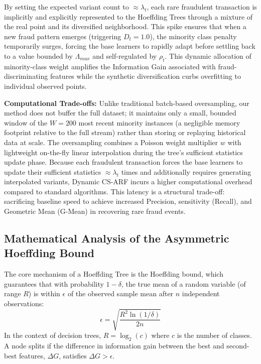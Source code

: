 \documentclass[review,12pt]{elsarticle}
\begin{document}
By setting the expected variant count to $\approx \lambda_t$, each rare fraudulent transaction is implicitly and explicitly represented to the Hoeffding Trees through a mixture of the real point and its diversified neighborhood. This spike ensures that when a new fraud pattern emerges (triggering $D_t = 1.0$), the minority class penalty temporarily surges, forcing the base learners to rapidly adapt before settling back to a value bounded by $\Lambda_{max}$ and self-regulated by $\rho_t$. This dynamic allocation of minority-class weight amplifies the Information Gain associated with fraud-discriminating features while the synthetic diversification curbs overfitting to individual observed points.

\textbf{Computational Trade-offs:} Unlike traditional batch-based oversampling, our method does not buffer the full dataset; it maintains only a small, bounded window of the $W{=}200$ most recent minority instances (a negligible memory footprint relative to the full stream) rather than storing or replaying historical data at scale. The oversampling combines a Poisson weight multiplier $w$ with lightweight on-the-fly linear interpolation during the tree's sufficient statistics update phase. Because each fraudulent transaction forces the base learners to update their sufficient statistics $\approx \lambda_t$ times and additionally requires generating interpolated variants, Dynamic CS-ARF incurs a higher computational overhead compared to standard algorithms. This latency is a structural trade-off: sacrificing baseline speed to achieve increased Precision, sensitivity (Recall), and Geometric Mean (G-Mean) in recovering rare fraud events.

\subsection{Mathematical Analysis of the Asymmetric Hoeffding Bound}
The core mechanism of a Hoeffding Tree is the Hoeffding bound, which guarantees that with probability $1 - \delta$, the true mean of a random variable (of range $R$) is within $\epsilon$ of the observed sample mean after $n$ independent observations:
\begin{equation}
    \epsilon = \sqrt{\frac{R^2 \ln(1/\delta)}{2n}}
\end{equation}
In the context of decision trees, $R = \log_2(c)$ where $c$ is the number of classes. A node splits if the difference in information gain between the best and second-best features, $\Delta G$, satisfies $\Delta G > \epsilon$.
\end{document}
